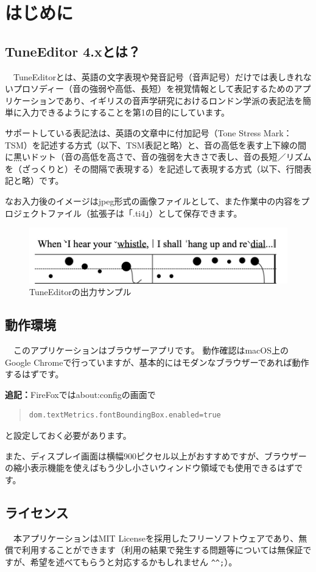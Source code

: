 \chapter{はじめに}

\section{TuneEditor 4.xとは？}

　TuneEditorとは、英語の文字表現や発音記号（音声記号）だけでは表しきれないプロソディー（音の強弱や高低、長短）を視覚情報として表記するためのアプリケーションであり、イギリスの音声学研究におけるロンドン学派の表記法を簡単に入力できるようにすることを第1の目的にしています。

サポートしている表記法は、英語の文章中に付加記号（Tone Stress Mark：TSM）を記述する方式（以下、\textsf{TSM表記}と略）と、音の高低を表す上下線の間に黒いドット（音の高低を高さで、音の強弱を大きさで表し、音の長短／リズムを（ざっくりと）その間隔で表現する）を記述して表現する方式（以下、\textsf{行間表記}と略）です。

なお入力後のイメージはjpeg形式の画像ファイルとして、また作業中の内容をプロジェクトファイル（拡張子は「.ti4」）として保存できます。
\smallskip

\begin{figure}[htbp]
\begin{center}
	\includegraphics[width=12cm]{TuneEditorSample.jpeg}
 \end{center}
 \caption{TuneEditorの出力サンプル}
 \label{sampleImage}
\end{figure}

\section{動作環境}

　このアプリケーションはブラウザーアプリです。
動作確認はmacOS上のGoogle Chromeで行っていますが、基本的にはモダンなブラウザーであれば動作する\textsf{はず}です。

\textbf{追記：}FireFoxではabout:configの画面で

\begin{quote}
\begin{verbatim}
dom.textMetrics.fontBoundingBox.enabled=true
\end{verbatim}
\end{quote}

と設定しておく必要があります。

また、ディスプレイ画面は横幅900ピクセル以上がおすすめですが、ブラウザーの縮小表示機能を使えばもう少し小さいウィンドウ領域でも使用できるはずです。


\section{ライセンス}

　本アプリケーションはMIT Licenseを採用したフリーソフトウェアであり、無償で利用することができます（利用の結果で発生する問題等については無保証ですが、希望を述べてもらうと対応するかもしれません \verb+^^;+）。
